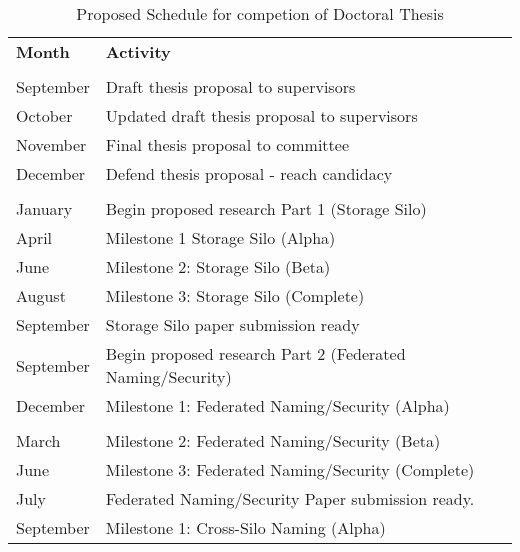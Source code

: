 \begin{table}[htbp]
  \centering
  \caption{Proposed Schedule for competion of Doctoral Thesis}
  \begin{tabular}{p{}p{}}
    \textbf{Month} & \textbf{Activity}                                          \\
    \rowcolor[HTML]{C0C0C0} \multicolumn{2}{c}{2021}                            \\
    September      & Draft thesis proposal to supervisors                       \\
    October        & Updated draft thesis proposal to supervisors               \\
    November       & Final thesis proposal to committee                         \\
    December       & Defend thesis proposal - reach candidacy                   \\
    \rowcolor[HTML]{C0C0C0} \multicolumn{2}{c}{2022}                            \\
    January        & Begin proposed research Part 1 (Storage Silo)              \\
    April          & Milestone 1 Storage Silo (Alpha)                           \\
    June           & Milestone 2: Storage Silo (Beta)                           \\
    August         & Milestone 3: Storage Silo (Complete)                       \\
    September      & Storage Silo paper submission ready                        \\
    September      & Begin proposed research Part 2 (Federated Naming/Security) \\
    December       & Milestone 1: Federated Naming/Security (Alpha)             \\
    \rowcolor[HTML]{C0C0C0} \multicolumn{2}{c}{2023}                            \\
    March          & Milestone 2: Federated Naming/Security (Beta)              \\
    June           & Milestone 3: Federated Naming/Security (Complete)          \\
    July           & Federated Naming/Security Paper submission ready.          \\
    September      & Milestone 1: Cross-Silo Naming (Alpha)                     \\

\end{tabular}
\end{table}
